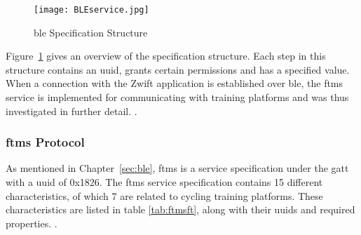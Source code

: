 \begin{figure}[H]
	\begin{center}
		\texttt{[image: BLEservice.jpg]}
		\caption{\ac{ble} Specification Structure}
		\label{fig:serv}
		\citep[Adapted from][]{Townsend:2014}
	\end{center}
\end{figure}

Figure~\ref{fig:serv} gives an overview of the specification structure. Each step in this structure contains an \ac{uuid}, grants certain permissions and has a specified value. When a connection with the Zwift application is established over \ac{ble}, the \ac{ftms} service is implemented for communicating with training platforms and was thus investigated in further detail. \cite[2017]{BLSIG:2017}.

\subsubsection{\acf{ftms} Protocol}\label{sec:ftms}

As mentioned in Chapter~\ref{sec:ble}, \acf{ftms} is a service specification under the \acf{gatt} with a \ac{uuid} of 0x1826. The \ac{ftms} service specification contains 15 different characteristics, of which 7 are related to cycling training platforms. These characteristics are listed in table \ref{tab:ftmsft}, along with their \acp{uuid} and required properties. \cite[2017]{BLSIG:2017}.


